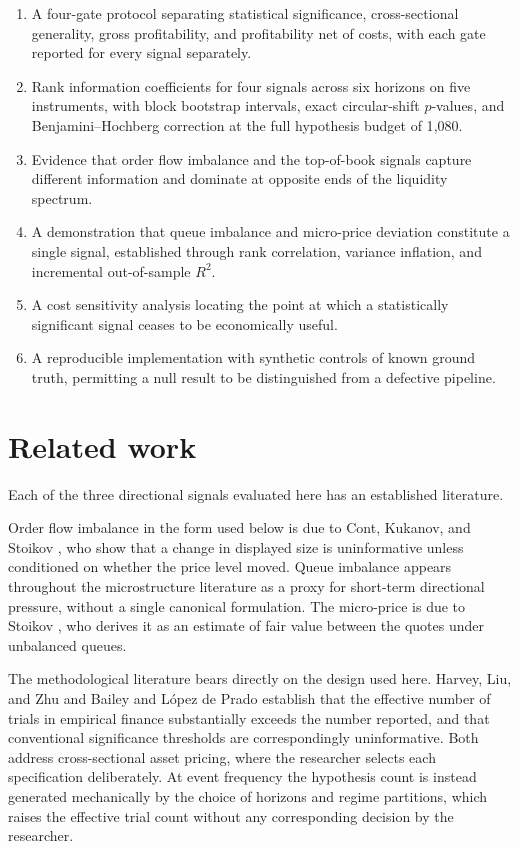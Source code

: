 \documentclass[11pt]{scrartcl}
\begin{document}
\begin{enumerate}[label=(\arabic*)]
\item A four-gate protocol separating statistical significance, cross-sectional generality, gross profitability, and profitability net of costs, with each gate reported for every signal separately.
\item Rank information coefficients for four signals across six horizons on five instruments, with block bootstrap intervals, exact circular-shift $p$-values, and Benjamini--Hochberg correction at the full hypothesis budget of 1{,}080.
\item Evidence that order flow imbalance and the top-of-book signals capture different information and dominate at opposite ends of the liquidity spectrum.
\item A demonstration that queue imbalance and micro-price deviation constitute a single signal, established through rank correlation, variance inflation, and incremental out-of-sample $R^2$.
\item A cost sensitivity analysis locating the point at which a statistically significant signal ceases to be economically useful.
\item A reproducible implementation with synthetic controls of known ground truth, permitting a null result to be distinguished from a defective pipeline.
\end{enumerate}

\section{Related work}
\label{sec:related}

Each of the three directional signals evaluated here has an established literature.

Order flow imbalance in the form used below is due to Cont, Kukanov, and Stoikov \cite{Cont2014}, who show that a change in displayed size is uninformative unless conditioned on whether the price level moved. Queue imbalance appears throughout the microstructure literature as a proxy for short-term directional pressure, without a single canonical formulation. The micro-price is due to Stoikov \cite{Stoikov2018}, who derives it as an estimate of fair value between the quotes under unbalanced queues.

The methodological literature bears directly on the design used here. Harvey, Liu, and Zhu \cite{Harvey2016} and Bailey and L\'opez de Prado \cite{Bailey2014} establish that the effective number of trials in empirical finance substantially exceeds the number reported, and that conventional significance thresholds are correspondingly uninformative. Both address cross-sectional asset pricing, where the researcher selects each specification deliberately. At event frequency the hypothesis count is instead generated mechanically by the choice of horizons and regime partitions, which raises the effective trial count without any corresponding decision by the researcher.
\end{document}

